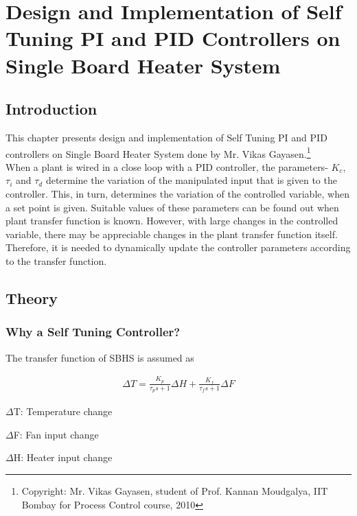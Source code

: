 
\chapter{Design and Implementation of Self Tuning PI and PID Controllers on Single Board Heater System}

\section{Introduction}%
This chapter presents design and implementation of Self Tuning PI and PID controllers on Single Board Heater System done by
Mr. Vikas Gayasen.\footnote{Copyright: Mr. Vikas Gayasen, student of Prof. Kannan Moudgalya, IIT Bombay for Process Control 
course, 2010}\\
When a plant is wired in a close loop with a PID controller, the parameters- $K_c$, $\tau_i$ and $\tau_d$ determine the 
variation of the manipulated input that is given to the controller. This, in turn, determines the variation of the controlled
variable, when a set point is given. Suitable values of these parameters can be found out when plant transfer function is 
known. However, with large changes in the controlled variable, there may be appreciable changes in the plant transfer 
function itself. Therefore, it is needed to dynamically update the controller parameters according to the transfer function.



\section{Theory}
\subsection{Why a Self Tuning Controller?}
The transfer function of SBHS is assumed as 


\begin{align}
\Delta T = \frac {K_p}{\tau_ps+1} \Delta H + \frac {K_f}{\tau_fs+1} \Delta F 
\end{align}
 
$\Delta$T: Temperature change

$\Delta$F: Fan input change

$\Delta$H: Heater input change\\

